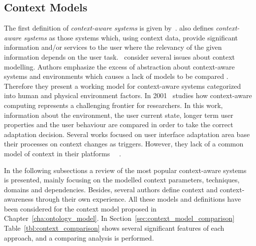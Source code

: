 \subsection{Context Models}
\label{sec:context_models}

The first definition of \textit{context-aware systems} is given by~\citet{schilit_disseminating_1994}.
\citet{dey_understanding_2001} also defines \textit{context-aware systems} as
those systems which, using context data, provide significant information and/or
services to the user where the relevancy of the given information depends on the
user task.~\citet{schmidt_there_1999} consider several issues about context
modelling. Authors emphasize the excess of abstraction about context-aware systems
and environments which causes a lack of models to be compared . Therefore they
present a working model for context-aware systems categorized into human and
physical environment factors. In 2001~\citet{jameson_modelling_2001} studies how
context-aware computing represents a challenging frontier for researchers. In
this work, information about the environment, the user current state, longer
term user properties and the user behaviour are compared in order to take the
correct adaptation decision. Several works focused on user interface adaptation
area base their processes on context changes as triggers. However, they lack of
a common model of context in their platforms~\citep{calvary_plasticity_2002}
~\citep{nilsson_model_based_2006}.

In the following subsections a review of the most popular context-aware systems
is presented, mainly focusing on the modelled context parameters, techniques, 
domains and dependencies. Besides, several authors define context and 
context-awareness through their own experience. All these models and definitions 
have been considered for the context model proposed in 
Chapter~\ref{cha:ontology_model}. In Section~\ref{sec:context_model_comparison} 
Table~\ref{tbl:context_comparison} shows several significant features of each 
approach, and a comparing analysis is performed.















